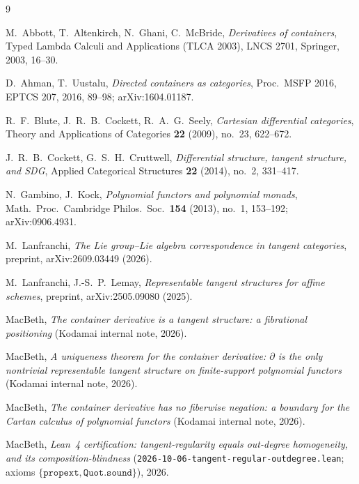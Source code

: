 \documentclass[11pt]{article}
\theoremstyle{definition}
\begin{document}
\begin{thebibliography}{9}

M.~Abbott, T.~Altenkirch, N.~Ghani, C.~McBride,
\emph{Derivatives of containers},
Typed Lambda Calculi and Applications (TLCA 2003), LNCS 2701, Springer, 2003, 16--30.

D.~Ahman, T.~Uustalu,
\emph{Directed containers as categories},
Proc.\ MSFP 2016, EPTCS 207, 2016, 89--98; arXiv:1604.01187.

R.~F.~Blute, J.~R.~B.~Cockett, R.~A.~G.~Seely,
\emph{Cartesian differential categories},
Theory and Applications of Categories \textbf{22} (2009), no.~23, 622--672.

J.~R.~B.~Cockett, G.~S.~H.~Cruttwell,
\emph{Differential structure, tangent structure, and SDG},
Applied Categorical Structures \textbf{22} (2014), no.~2, 331--417.

N.~Gambino, J.~Kock,
\emph{Polynomial functors and polynomial monads},
Math.\ Proc.\ Cambridge Philos.\ Soc.\ \textbf{154} (2013), no.~1, 153--192; arXiv:0906.4931.

M.~Lanfranchi,
\emph{The Lie group--Lie algebra correspondence in tangent categories},
preprint, arXiv:2609.03449 (2026).

M.~Lanfranchi, J.-S.~P.~Lemay,
\emph{Representable tangent structures for affine schemes},
preprint, arXiv:2505.09080 (2025).

MacBeth,
\emph{The container derivative is a tangent structure: a fibrational positioning}
(Kodamai internal note, 2026).

MacBeth,
\emph{A uniqueness theorem for the container derivative: $\partial$ is the only nontrivial
representable tangent structure on finite-support polynomial functors}
(Kodamai internal note, 2026).

MacBeth,
\emph{The container derivative has no fiberwise negation: a boundary for the Cartan calculus of
polynomial functors}
(Kodamai internal note, 2026).

MacBeth,
\emph{Lean~4 certification: tangent-regularity equals out-degree homogeneity, and its
composition-blindness}
(\texttt{2026-10-06-tangent-regular-outdegree.lean}; axioms
$\{\texttt{propext},\texttt{Quot.sound}\}$), 2026.

\end{thebibliography}
\end{document}
